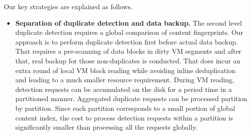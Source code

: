 Our key strategies are explained as follows.
\begin{itemize}


\item {\bf Separation of duplicate detection and data backup.}
The second level duplicate detection requires a global comparison of 
content fingerprints.
Our approach is to perform duplicate detection first before actual data backup.
That requires a pre-scanning of  data  blocks in dirty VM segments  and after that, real backup  for those non-duplicates
is conducted. That does incur an extra  round of local VM block reading while avoiding inline 
deduplication and leading to a much smaller resource requirement.  
During VM reading, detection requests can be accumulated on the disk 
for a period time  in a  partitioned manner.  Aggregated duplicate requests can be processed partition by partition. 
Since each partition corresponds to a small portion of global content index, the cost to 
process detection requests within a partition is significantly smaller than processing all the requests globally.


\end{itemize}

